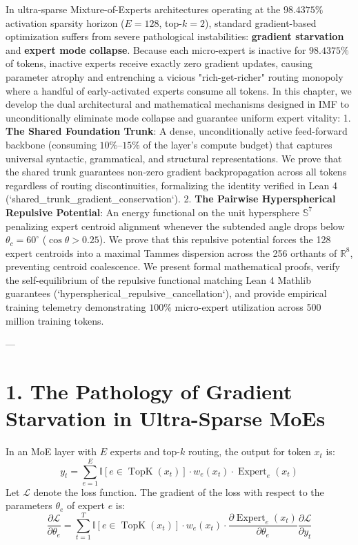 \documentclass[11pt,twoside,openright]{amsbook}
\begin{document}
{{{{{{{{In ultra-sparse Mixture-of-Experts architectures operating at the $98.4375\%$ activation sparsity horizon ($E = 128$, top-$k = 2$), standard gradient-based optimization suffers from severe pathological instabilities: \textbf{gradient starvation} and \textbf{expert mode collapse}. Because each micro-expert is inactive for $98.4375\%$ of tokens, inactive experts receive exactly zero gradient updates, causing parameter atrophy and entrenching a vicious "rich-get-richer" routing monopoly where a handful of early-activated experts consume all tokens. In this chapter, we develop the dual architectural and mathematical mechanisms designed in IMF to unconditionally eliminate mode collapse and guarantee uniform expert vitality:
1. \textbf{The Shared Foundation Trunk}: A dense, unconditionally active feed-forward backbone (consuming $10\%\text{--}15\%$ of the layer's compute budget) that captures universal syntactic, grammatical, and structural representations. We prove that the shared trunk guarantees non-zero gradient backpropagation across all tokens regardless of routing discontinuities, formalizing the identity verified in Lean 4 (`shared_trunk_gradient_conservation`).
2. \textbf{The Pairwise Hyperspherical Repulsive Potential}: An energy functional on the unit hypersphere $\mathbb{S}^7$ penalizing expert centroid alignment whenever the subtended angle drops below $\theta_c = 60^\circ$ ($\cos\theta > 0.25$). We prove that this repulsive potential forces the 128 expert centroids into a maximal Tammes dispersion across the 256 orthants of $\mathbb{R}^8$, preventing centroid coalescence.
We present formal mathematical proofs, verify the self-equilibrium of the repulsive functional matching Lean 4 Mathlib guarantees (`hyperspherical_repulsive_cancellation`), and provide empirical training telemetry demonstrating $100\%$ micro-expert utilization across 500 million training tokens.

---

\section{1. The Pathology of Gradient Starvation in Ultra-Sparse MoEs}

In an MoE layer with $E$ experts and top-$k$ routing, the output for token $x_t$ is:
$$y_t = \sum_{e=1}^E \mathbb{I}[e \in \operatorname{TopK}(x_t)] \cdot w_e(x_t) \cdot \operatorname{Expert}_e(x_t)$$
Let $\mathcal{L}$ denote the loss function. The gradient of the loss with respect to the parameters $\theta_e$ of expert $e$ is:
$$\frac{\partial \mathcal{L}}{\partial \theta_e} = \sum_{t=1}^T \mathbb{I}[e \in \operatorname{TopK}(x_t)] \cdot w_e(x_t) \cdot \frac{\partial \operatorname{Expert}_e(x_t)}{\partial \theta_e} \frac{\partial \mathcal{L}}{\partial y_t}$$

}}}}}}}}
\end{document}
